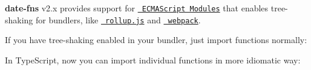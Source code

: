 {\bfseries{date-\/fns}} v2.\+x provides support for \href{http://www.ecma-international.org/ecma-262/6.0/\#sec-modules}{\texttt{ ECMAScript Modules}} that enables tree-\/shaking for bundlers, like \href{http://rollupjs.org}{\texttt{ rollup.\+js}} and \href{https://webpack.js.org}{\texttt{ webpack}}.

If you have tree-\/shaking enabled in your bundler, just import functions normally\+:


\begin{DoxyCode}{0}

\end{DoxyCode}


In Type\+Script, now you can import individual functions in more idiomatic way\+:


\begin{DoxyCode}{0}
\DoxyCodeLine{}

\end{DoxyCode}
 